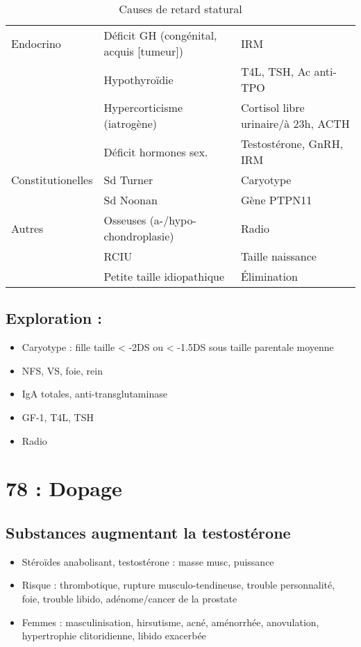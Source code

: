 \documentclass[11pt]{article}
\begin{document}
\begin{table}[htbp]
\caption{\label{tab:org5f62073}
Causes de retard statural}
\centering
\begin{tabular}{lll}
\toprule
Endocrino & Déficit GH (congénital, acquis [tumeur]) & IRM\\
 & Hypothyroïdie & T4L, TSH, Ac anti-TPO\\
 & Hypercorticisme (iatrogène) & Cortisol libre urinaire/à 23h, ACTH\\
 & Déficit hormones sex. & Testostérone, GnRH, IRM\\
\midrule
Constitutionelles & Sd Turner & Caryotype\\
 & Sd Noonan & Gène PTPN11\\
\midrule
Autres & Osseuses (a-/hypo-chondroplasie) & Radio\\
 & RCIU & Taille naissance\\
 & Petite taille idiopathique & Élimination\\
\bottomrule
\end{tabular}
\end{table}


\subsection{Exploration :}
\label{sec:org97bd2e9}
\begin{itemize}
\item Caryotype : fille taille < -2DS ou < -1.5DS sous taille parentale moyenne
\item NFS, VS, foie, rein
\item IgA totales, anti-transglutaminase
\item GF-1, T4L, TSH
\item Radio
\end{itemize}

\section{78 : Dopage}
\label{sec:org23883f7}
\subsection{Substances augmentant la testostérone}
\label{sec:org0231f48}
\begin{itemize}
\item Stéroïdes anabolisant, testostérone : \inc masse musc, puissance
\item Risque : thrombotique, rupture musculo-tendineuse, trouble personnalité, foie, trouble libido, adénome/cancer de la prostate
\item Femmes : masculinisation, hirsutisme, acné, aménorrhée, anovulation, hypertrophie clitoridienne, libido exacerbée
\end{itemize}
\end{document}
